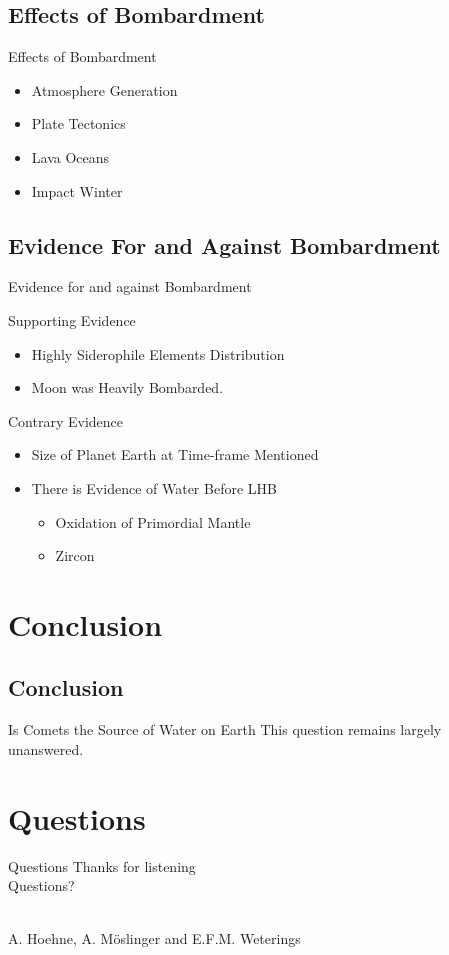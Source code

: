 \documentclass[11pt, aspectratio=169]{beamer}
\begin{document}
\subsection{Effects of Bombardment}
\begin{frame}[t]{Effects of Bombardment}
\begin{itemize}
\item Atmosphere Generation
\item Plate Tectonics
\item Lava Oceans
\item Impact Winter
\end{itemize}
\end{frame}

\subsection{Evidence For and Against Bombardment}
\begin{frame}[t]{Evidence for and against Bombardment}

Supporting Evidence
\begin{itemize}
    \item Highly Siderophile Elements Distribution
    \item Moon was Heavily Bombarded.
\end{itemize}
\bigskip

Contrary Evidence
\begin{itemize}
    \item Size of Planet Earth at Time-frame Mentioned
    \item There is Evidence of Water Before LHB
        \begin{itemize}
            \item Oxidation of Primordial Mantle
            \item Zircon
        \end{itemize}
\end{itemize}
\end{frame}

\section{Conclusion}
\subsection{Conclusion}
\begin{frame}[t]{Is Comets the Source of Water on Earth}
\centering
\huge This question remains largely unanswered.
\end{frame}

\section{Questions}
\begin{frame}{Questions}
\centering
\Huge Thanks for listening\\

\huge Questions?\\\

\large A. Hoehne, A. M\"{o}slinger and E.F.M. Weterings\\

\end{frame}
\end{document}
